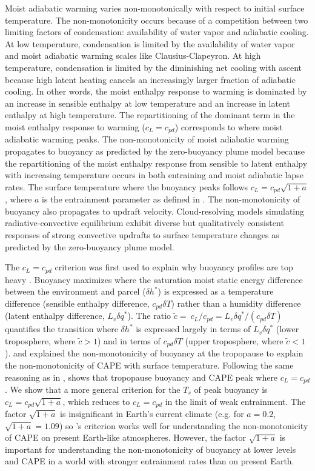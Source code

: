 \documentclass[]{ametsocV6.1}
\begin{document}
Moist adiabatic warming varies non-monotonically with respect to initial surface temperature. The non-monotonicity occurs because of a competition between two limiting factors of condensation: availability of water vapor and adiabatic cooling. At low temperature, condensation is limited by the availability of water vapor and moist adiabatic warming scales like Clausius-Clapeyron. At high temperature, condensation is limited by the diminishing net cooling with ascent because high latent heating cancels an increasingly larger fraction of adiabatic cooling. In other words, the moist enthalpy response to warming is dominated by an increase in sensible enthalpy at low temperature and an increase in latent enthalpy at high temperature. The repartitioning of the dominant term in the moist enthalpy response to warming ($c_L=c_{pd}$) corresponds to where moist adiabatic warming peaks. The non-monotonicity of moist adiabatic warming propagates to buoyancy as predicted by the zero-buoyancy plume model because the repartitioning of the moist enthalpy response from sensible to latent enthalpy with increasing temperature occurs in both entraining and moist adiabatic lapse rates. The surface temperature where the buoyancy peaks follows $c_L = c_{pd} \sqrt{1+a}$, where $a$ is the entrainment parameter as defined in \cite{romps2016}. The non-monotonicity of buoyancy also propagates to updraft velocity. Cloud-resolving models simulating radiative-convective equilibrium exhibit diverse but qualitatively consistent responses of strong convective updrafts to surface temperature changes as predicted by the zero-buoyancy plume model.

The $c_L=c_{pd}$ criterion was first used to explain why buoyancy profiles are top heavy \citep{seeley2016}. Buoyancy maximizes where the saturation moist static energy difference between the environment and parcel ($\delta h^*$) is expressed as a temperature difference (sensible enthalpy difference, $c_{pd}\delta T$) rather than a humidity difference (latent enthalpy difference, $L_v\delta q^*$). The ratio $\tilde{c}= \ c_L / c_{pd} = L_v \delta q^* / (c_{pd} \delta T)$ quantifies the transition where $\delta h^*$ is expressed largely in terms of $L_v \delta q^*$ (lower troposphere, where $\tilde{c}>1$) and in terms of $c_{pd}\delta T$ (upper troposphere, where $\tilde{c}<1$).  and \cite{romps2016} explained the non-monotonicity of buoyancy at the tropopause to explain the non-monotonicity of CAPE with surface temperature. Following the same reasoning as in \cite{seeley2016}, \cite{romps2016} shows that tropopause buoyancy and CAPE peak where $c_L = c_{pd}$. We show that a more general criterion for the $T_s$ of peak buoyancy is $c_L = c_{pd}\sqrt{1+a}$, which reduces to $c_L = c_{pd}$ in the limit of weak entrainment. The factor $\sqrt{1+a}$ is insignificant in Earth's current climate (e.g. for $a=0.2$, $\sqrt{1+a}=1.09$) so \cite{romps2016}'s criterion works well for understanding the non-monotonicity of CAPE on present Earth-like atmospheres. However, the factor $\sqrt{1+a}$ is important for understanding the non-monotonicity of buoyancy at lower levels and CAPE in a world with stronger entrainment rates than on present Earth.
\end{document}
